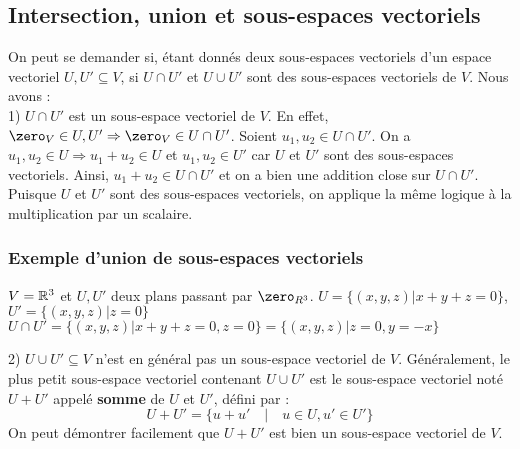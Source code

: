 \documentclass[12pt]{article}
\begin{document}
\subsection{Intersection, union et sous-espaces vectoriels}
On peut se demander si, étant donnés deux sous-espaces vectoriels d'un espace vectoriel $U, U' \subseteq V$, si 
$U \cap U'$ et $U \cup U'$ sont des sous-espaces vectoriels de $V$. Nous avons :
\\
1) $U \cap U'$ est un sous-espace vectoriel de $V$. En effet, $\zero_V \in U, U' \Rightarrow \zero_V \in U \cap U'$.
Soient $u_1, u_2 \in U \cap U'$. On a $u_1, u_2 \in U \Rightarrow u_1 + u_2 \in U$ et $u_1, u_2 \in U'$ car $U$ et $U'$ sont des sous-espaces vectoriels.
Ainsi, $u_1 + u_2 \in U \cap U'$ et  on a bien une addition close sur $U \cap U'$.
Puisque $U$ et $U'$ sont des sous-espaces vectoriels, on applique la même logique à la multiplication par un scalaire.
\\
\subsubsection{Exemple d'union de sous-espaces vectoriels}
$V = \mathbb{R}^3$ et $U, U'$ deux plans passant par $\zero_{R^3}$. 
$U = \{(x,y,z) | x + y + z = 0\}$, $U' = \{(x,y,z) | z = 0\}$
\\
$U \cap U' = \{(x,y,z) | x + y + z = 0, z = 0\} = \{(x,y,z) | z = 0, y = -x\}$
\begin{center}
\end{center}
2) $U \cup U' \subseteq V$ n'est en général pas un sous-espace vectoriel de $V$.
Généralement, le plus petit sous-espace vectoriel contenant $U \cup U'$ est le sous-espace vectoriel noté $U + U'$ appelé \textbf{somme} de $U$ et $U'$, défini par :
$$
U +U ' = \{u+u' \quad | \quad u \in U, u' \in U'\}$$
On peut démontrer facilement que $U+U'$ est bien un sous-espace vectoriel de $V$.
\end{document}
